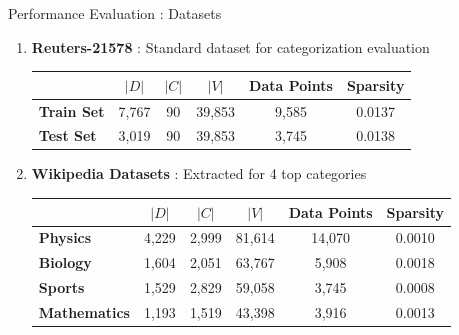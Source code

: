 \documentclass[10pt]{beamer}
\newcommand{\setD}{\ensuremath{D} }
\newcommand{\setW}{\ensuremath{V} }
\newcommand{\setC}{\ensuremath{C} }
\begin{document}
\begin{frame}{Performance Evaluation : Datasets }

\begin{enumerate}
	\vfill\item<1-> \textbf{Reuters-21578} : Standard dataset for categorization evaluation
	\vfill	\begin{table}[h!]
	\scriptsize
	\begin{center}
	\begin{tabular}{l c c c c c} %
	\toprule
	& \textbf{$|\setD|$} & \textbf{$|\setC|$} & \textbf{$|\setW|$} & \textbf{Data Points} & \textbf{Sparsity}\\
	\midrule
	\textbf{Train Set}	& 7,767 & 90 & 39,853 & 9,585 & 0.0137 \\
	\textbf{Test Set}	& 3,019 & 90 & 39,853 & 3,745 & 0.0138 \\
	\bottomrule         
	\end{tabular}
	\end{center}
	\end{table}
	\vfill\item<1-> \textbf{Wikipedia Datasets} : Extracted for 4 top categories
	\vfill \begin{table}[h!]
	\scriptsize
	\begin{center}
	\begin{tabular}{l c c c c c} %
	\toprule
	& \textbf{$|\setD|$} & \textbf{$|\setC|$} & \textbf{$|\setW|$} & \textbf{Data Points} & \textbf{Sparsity}\\
	\midrule
	\textbf{Physics}		& 4,229 & 2,999 & 81,614 & 14,070 & 0.0010 \\
	\textbf{Biology}		& 1,604 & 2,051 & 63,767 & 5,908 & 0.0018 \\
	\textbf{Sports}			& 1,529 & 2,829 & 59,058 & 3,745 & 0.0008 \\
	\textbf{Mathematics}	& 1,193 & 1,519 & 43,398 & 3,916 & 0.0013 \\
	\bottomrule         
	\end{tabular}
	\end{center}
	\end{table}
	\end{enumerate}
\end{frame}
\end{document}
